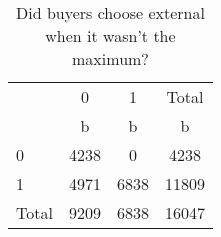\begin{table}[htbp]\centering
\def\sym#1{\ifmmode^{#1}\else\(^{#1}\)\fi}
\caption{Did buyers choose external when it wasn't the maximum?}
\begin{tabular}{l*{3}{c}}
\hline\hline
            &           0&           1&       Total\\
            &           b&           b&           b\\
\hline
0           &        4238&           0&        4238\\
1           &        4971&        6838&       11809\\
Total       &        9209&        6838&       16047\\
\hline\hline
\end{tabular}
\end{table}
